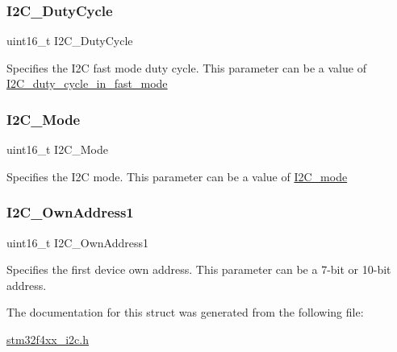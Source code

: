 \subsubsection{\texorpdfstring{I2\+C\+\_\+\+Duty\+Cycle}{I2C\_DutyCycle}}
{\footnotesize\ttfamily uint16\+\_\+t I2\+C\+\_\+\+Duty\+Cycle}

Specifies the I2C fast mode duty cycle. This parameter can be a value of \mbox{\hyperlink{group___i2_c__duty__cycle__in__fast__mode}{I2\+C\+\_\+duty\+\_\+cycle\+\_\+in\+\_\+fast\+\_\+mode}} \mbox{\label{struct_i2_c___init_type_def_a165269b65702e348e32ccd8029e65af1}} 
\subsubsection{\texorpdfstring{I2\+C\+\_\+\+Mode}{I2C\_Mode}}
{\footnotesize\ttfamily uint16\+\_\+t I2\+C\+\_\+\+Mode}

Specifies the I2C mode. This parameter can be a value of \mbox{\hyperlink{group___i2_c__mode}{I2\+C\+\_\+mode}} \mbox{\label{struct_i2_c___init_type_def_ae62dca9cea4fdb3eb8f9554b5f35fe4f}} 
\subsubsection{\texorpdfstring{I2\+C\+\_\+\+Own\+Address1}{I2C\_OwnAddress1}}
{\footnotesize\ttfamily uint16\+\_\+t I2\+C\+\_\+\+Own\+Address1}

Specifies the first device own address. This parameter can be a 7-\/bit or 10-\/bit address. 

The documentation for this struct was generated from the following file\+:\begin{DoxyCompactItemize}
\item 
\mbox{\hyperlink{stm32f4xx__i2c_8h}{stm32f4xx\+\_\+i2c.\+h}}\end{DoxyCompactItemize}
